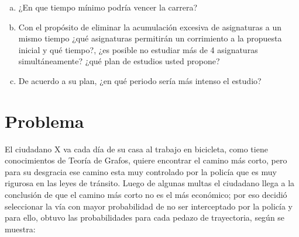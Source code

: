 \documentclass[autocontact]{gaceta}
\begin{document}
        \begin{center}
            \begin{enumerate}[a)]
                \item ¿En que tiempo mínimo podría vencer la carrera?
                \item Con el propósito de eliminar la acumulación excesiva de asignaturas a un mismo 
                tiempo ¿qué asignaturas permitirán un corrimiento a la propuesta inicial y qué tiempo?,
                ¿es posible no estudiar más de 4 asignaturas simultáneamente? ¿qué plan de estudios 
                usted propone?
                \item De acuerdo a su plan, ¿en qué periodo sería más intenso el estudio?
            \end{enumerate}
        \end{center}
        
        
        \pagebreak

\section{Problema}
        El ciudadano X va cada día de su casa al trabajo en bicicleta, como tiene conocimientos
        de Teoría de Grafos, quiere encontrar el camino más corto, pero para su desgracia ese 
        camino esta muy controlado por la policía que es muy rigurosa en las leyes de tránsito.
        Luego de algunas multas el ciudadano llega a la conclusión de que el camino más corto no
        es el más económico; por eso decidió seleccionar la vía con mayor probabilidad de no ser 
        interceptado por la policía y para ello, obtuvo las probabilidades para  cada pedazo de
        trayectoria, según se muestra:
        
        \pagebreak


\end{document}
